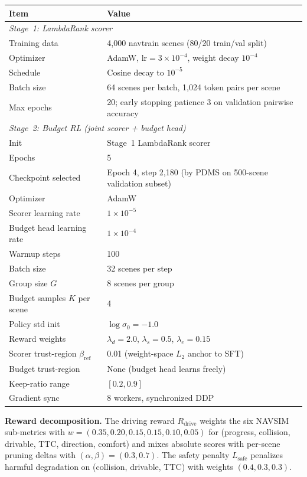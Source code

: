 \documentclass[letterpaper]{article}
\begin{document}
\begin{center}
\begin{tabular}{@{}ll@{}}
\toprule
Item & Value \\
\midrule
\multicolumn{2}{l}{\emph{Stage~1: LambdaRank scorer}} \\
Training data & 4,000 navtrain scenes (80/20 train/val split) \\
Optimizer & AdamW, $\mathrm{lr}=3\times10^{-4}$, weight decay $10^{-4}$ \\
Schedule & Cosine decay to $10^{-5}$ \\
Batch size & 64 scenes per batch, 1,024 token pairs per scene \\
Max epochs & 20; early stopping patience 3 on validation pairwise accuracy \\
\cmidrule(lr){1-2}
\multicolumn{2}{l}{\emph{Stage~2: Budget RL (joint scorer + budget head)}} \\
Init & Stage~1 LambdaRank scorer \\
Epochs & 5 \\
Checkpoint selected & Epoch 4, step 2,180 (by PDMS on 500-scene validation subset) \\
Optimizer & AdamW \\
Scorer learning rate & $1\times10^{-5}$ \\
Budget head learning rate & $1\times10^{-4}$ \\
Warmup steps & 100 \\
Batch size & 32 scenes per step \\
Group size $G$ & 8 scenes per group \\
Budget samples $K$ per scene & 4 \\
Policy std init & $\log\sigma_0 = -1.0$ \\
Reward weights & $\lambda_d{=}2.0$, $\lambda_s{=}0.5$, $\lambda_e{=}0.15$ \\
Scorer trust-region $\beta_{\mathrm{ref}}$ & 0.01 (weight-space $L_2$ anchor to SFT) \\
Budget trust-region & None (budget head learns freely) \\
Keep-ratio range & $[0.2, 0.9]$ \\
Gradient sync & 8 workers, synchronized DDP \\
\bottomrule
\end{tabular}
\end{center}

\textbf{Reward decomposition.} The driving reward $R_{\mathrm{drive}}$ weights the six NAVSIM
sub-metrics with $w{=}(0.35,0.20,0.15,0.15,0.10,0.05)$ for (progress, collision, drivable, TTC,
direction, comfort) and mixes absolute scores with per-scene pruning deltas with
$(\alpha,\beta)=(0.3,0.7)$. The safety penalty $L_{\mathrm{safe}}$ penalizes harmful degradation
on (collision, drivable, TTC) with weights $(0.4,0.3,0.3)$.
\end{document}
